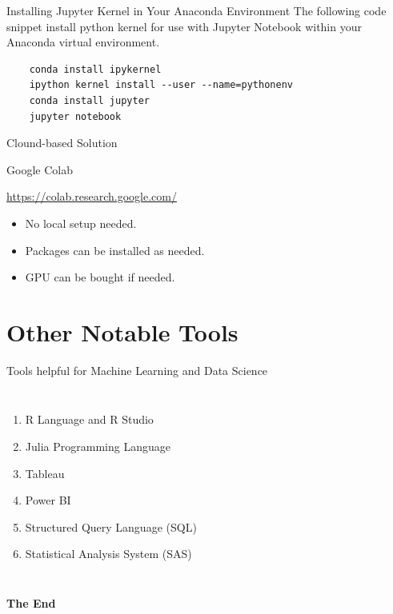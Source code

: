\documentclass[aspectratio=169,xcolor=dvipsnames,svgnames,x11names,fleqn]{beamer}
\begin{document}
\begin{frame}[containsverbatim]{Installing Jupyter Kernel in Your Anaconda Environment}
    The following code snippet install python kernel for use with Jupyter Notebook within your Anaconda virtual environment.

    \begin{verbatim}
    conda install ipykernel
    ipython kernel install --user --name=pythonenv
    conda install jupyter
    jupyter notebook
    \end{verbatim}
\end{frame}

\begin{frame}{Clound-based Solution}
    \begin{center}
    Google Colab

    \url{https://colab.research.google.com/}
    \begin{itemize}
        \item No local setup needed. 
        \item Packages can be installed as needed.
        \item GPU can be bought if needed.
    \end{itemize}
    \end{center}
\end{frame}


\section{Other Notable Tools}

\begin{frame}
    \sectionpage
\end{frame}


\begin{frame}{Tools helpful for Machine Learning and Data Science}

    \begin{columns}
        \begin{enumerate}
            \item R Language and R Studio
            \item Julia Programming Language
            \item Tableau
            \item Power BI
            \item Structured Query Language (SQL)
            \item Statistical Analysis System (SAS)
        \end{enumerate}
    \end{columns}
    
\end{frame}

\begin{frame}
    \Huge{\centerline{\color{bubblegumPink}\textbf{The End}}}
\end{frame}
\end{document}
